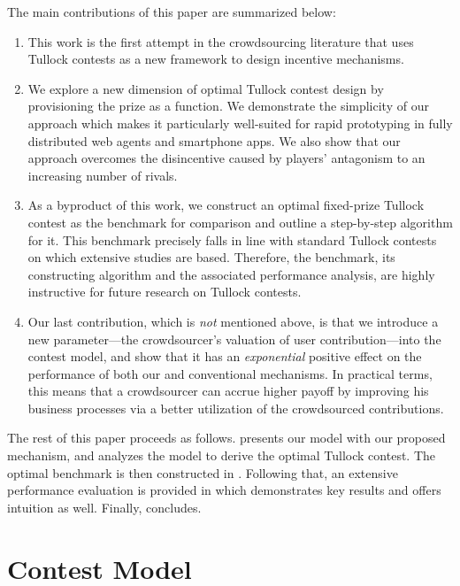 \documentclass{sig-alternate-10pt}
\begin{document}
The main contributions of this paper are summarized below:
\begin{enumerate}[leftmargin=1em]
\item This work is the first attempt in the crowdsourcing literature that uses Tullock contests as a new framework to design incentive mechanisms.
\item We explore a new dimension of optimal Tullock contest design by provisioning the prize as a function. We demonstrate the simplicity of our approach which makes it particularly well-suited for rapid prototyping in fully distributed web agents and smartphone apps. We also show that our approach overcomes the disincentive caused by players' antagonism to an increasing number of rivals.
\item As a byproduct of this work, we construct an optimal fixed-prize Tullock contest as the benchmark for comparison and outline a step-by-step algorithm for it. This benchmark precisely falls in line with standard Tullock contests on which extensive studies are based. Therefore, the benchmark, its constructing algorithm and the associated performance analysis, are highly instructive for future research on Tullock contests. 
\item Our last contribution, which is {\em not} mentioned above, is that we introduce a new parameter---the crowdsourcer's valuation of user contribution---into the contest model, and show that it has an {\em exponential} positive effect on the performance of both our and conventional mechanisms. In practical terms, this means that a crowdsourcer can accrue higher payoff by improving his business processes via a better utilization of the crowdsourced contributions.
\end{enumerate}

The rest of this paper proceeds as follows.  presents our model with our proposed mechanism, and  analyzes the model to derive the optimal Tullock contest. The optimal benchmark is then constructed in . Following that, an extensive performance evaluation is provided in  which demonstrates key results and offers intuition as well. Finally,  concludes.













\section{Contest Model}\label{sec:model}
\end{document}
